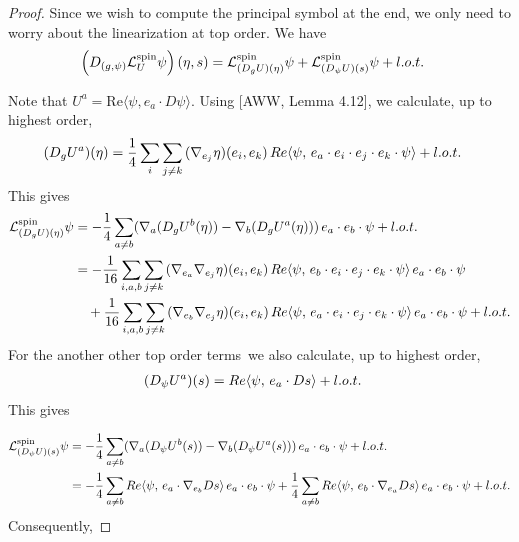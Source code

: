 \documentclass[10pt,a4paper]{amsart}
\newcommand{\lot}{\textup{l.o.t.}}
\begin{document}
\begin{proof}
	Since we wish to compute the principal symbol at the end, we only need to worry about the linearization at top order.	We have
	\begin{align}
		\left(D_{(g,\psi)}\mathcal{L}_{U}^{\text{spin}}\psi\right)(\eta,s) & = \mathcal{L}_{(D_g U)(\eta)}^{\text{spin}}\psi  + \mathcal{L}_{(D_\psi U)(s)}^{\text{spin}}\psi + \lot
	\end{align}
	
	Note that $U^a = \text{Re}\langle\psi, e_a\cdot D\psi\rangle $. 
	Using [AWW, Lemma 4.12], we calculate, up to highest order, 
	\begin{align}
		(D_g U^a)(\eta) &= \frac{1}{4}\sum_{i}\sum_{j\neq k}\, (\nabla_{e_j}\eta)(e_i, e_k)\, \textup{Re}\langle \psi,\, e_a\cdot e_i\cdot e_j\cdot e_k\cdot\psi\rangle  + \lot
	\end{align} 
	This gives
	\begin{equation}
		\begin{aligned}
			\mathcal{L}_{(D_g U)(\eta)}^{\text{spin}}\psi &=  -\frac{1}{4}\sum_{a\neq b}(\nabla_a (D_g U^b(\eta)) - \nabla_b (D_g U^a(\eta)))\, e_a\cdot e_b\cdot \psi + \lot\\
		&= -\frac{1}{16}\sum_{i,a,b}\sum_{j\neq k}\, (\nabla_{e_a}\nabla_{e_j}\eta)(e_i, e_k)\, \textup{Re}\langle \psi,\, e_b\cdot e_i\cdot e_j\cdot e_k\cdot\psi\rangle\, e_a\cdot e_b\cdot \psi\\
		&\quad + \frac{1}{16}\sum_{i,a,b}\sum_{j\neq k}\, (\nabla_{e_b}\nabla_{e_j}\eta)(e_i, e_k)\, \textup{Re}\langle \psi,\, e_a\cdot e_i\cdot e_j\cdot e_k\cdot\psi\rangle\, e_a\cdot e_b\cdot \psi + \lot
		\end{aligned}
	\end{equation}
For the another other top order terms\, we also calculate, up to highest order,
	\begin{align}
		&(D_\psi U^a)(s) = \textup{Re}\langle\psi,\, e_a\cdot Ds\rangle + \lot
	\end{align}
	This gives
	
	\begin{equation}
		\begin{aligned}
			\mathcal{L}_{(D_{\psi} U)(s)}^{\text{spin}}\psi &=  -\frac{1}{4}\sum_{a\neq b}(\nabla_a (D_{\psi} U^b(s)) - \nabla_b (D_{\psi}  U^a(s)))\, e_a\cdot e_b\cdot \psi + \lot\\
			&= -\frac{1}{4}\sum_{a\neq b}\textup{Re}\langle\psi,\, e_a\cdot \nabla_{e_b}Ds\rangle \, e_a\cdot e_b\cdot \psi  + \frac{1}{4}\sum_{a\neq b}\textup{Re}\langle\psi,\, e_b\cdot \nabla_{e_a}Ds\rangle \, e_a\cdot e_b\cdot \psi + \lot\\
		\end{aligned}
	\end{equation}
Consequently,


\end{proof}
\end{document}

